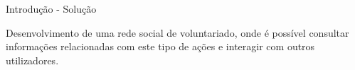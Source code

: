 
\begin{frame}{Introdução - Solução}

\vspace*{-3em}

Desenvolvimento de uma rede social de voluntariado, onde é possível consultar informações relacionadas com este tipo de ações e interagir com outros utilizadores.

\vspace*{1em}
\\

\vspace*{1em}

\end{frame}









